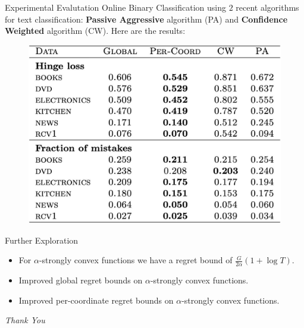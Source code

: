 \documentclass[
	11pt, %
]{beamer}
\begin{document}
\begin{frame}{Experimental Evalutation}
    Online Binary Classification using $2$ recent algorithms for text classification: \textbf{Passive Aggressive} algorithm (PA) and \textbf{Confidence Weighted} algorithm (CW). Here are the results:
    
    \begin{figure}
        \begin{center}
            \includegraphics[scale=0.2]{table.jpeg}
        \end{center}
    \end{figure}
\end{frame}

\begin{frame}{Further Exploration}
    \begin{itemize}
        \item For $\alpha$-strongly convex functions we have a regret bound of $\frac{G}{2\alpha}(1 + \log{T})$.
        \item Improved global regret bounds on $\alpha$-strongly convex functions.
        \item Improved per-coordinate regret bounds on $\alpha$-strongly convex functions.
    \end{itemize}
\end{frame}

\begin{frame}{}
    \centering \Large
    \emph{Thank You}
\end{frame}
\end{document}
